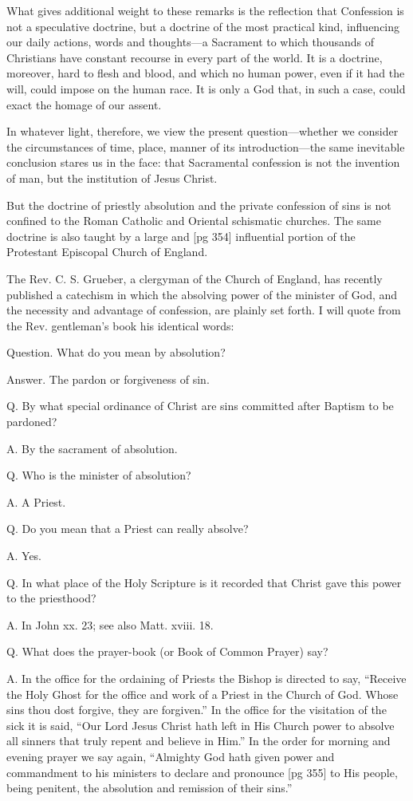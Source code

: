 What gives additional weight to these remarks
is the reflection that Confession is not a speculative
doctrine, but a doctrine of the most practical
kind, influencing our daily actions, words and
thoughts—a Sacrament to which thousands of
Christians have constant recourse in every part
of the world. It is a doctrine, moreover, hard to
flesh and blood, and which no human power, even
if it had the will, could impose on the human race.
It is only a God that, in such a case, could exact
the homage of our assent.

In whatever light, therefore, we view the present
question—whether we consider the circumstances
of time, place, manner of its introduction—the
same inevitable conclusion stares us in the
face: that Sacramental confession is not the invention
of man, but the institution of Jesus Christ.

But the doctrine of priestly absolution and the
private confession of sins is not confined to the
Roman Catholic and Oriental schismatic churches.
The same doctrine is also taught by a large and
[pg 354]
influential portion of the Protestant Episcopal
Church of England.

The Rev. C. S. Grueber, a clergyman of the
Church of England, has recently published a catechism
in which the absolving power of the minister
of God, and the necessity and advantage of
confession, are plainly set forth. I will quote
from the Rev. gentleman's book his identical
words:

Question. What do you mean by absolution?

Answer. The pardon or forgiveness of sin.

Q. By what special ordinance of Christ are
sins committed after Baptism to be pardoned?

A. By the sacrament of absolution.

Q. Who is the minister of absolution?

A. A Priest.

Q. Do you mean that a Priest can really absolve?

A. Yes.

Q. In what place of the Holy Scripture is it recorded
that Christ gave this power to the priesthood?

A. In John xx. 23; see also Matt. xviii. 18.

Q. What does the prayer-book (or Book of
Common Prayer) say?

A. In the office for the ordaining of Priests the
Bishop is directed to say, “Receive the Holy
Ghost for the office and work of a Priest in the
Church of God. Whose sins thou dost forgive,
they are forgiven.” In the office for the visitation
of the sick it is said, “Our Lord Jesus Christ
hath left in His Church power to absolve all sinners
that truly repent and believe in Him.” In
the order for morning and evening prayer we say
again, “Almighty God hath given power and commandment
to his ministers to declare and pronounce
[pg 355]
to His people, being penitent, the absolution
and remission of their sins.”

